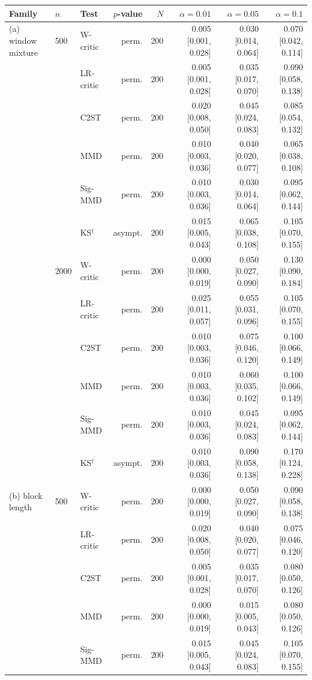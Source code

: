 \begin{tabular}{lllrrrrr}
\toprule
Family & $n$ & Test & $p$-value & $N$ & $\alpha=0.01$ & $\alpha=0.05$ & $\alpha=0.1$ \\
\midrule
(a) window mixture & 500 & W-critic & perm. & 200 & 0.005 [0.001, 0.028] & 0.030 [0.014, 0.064] & 0.070 [0.042, 0.114] \\
 &  & LR-critic & perm. & 200 & 0.005 [0.001, 0.028] & 0.035 [0.017, 0.070] & 0.090 [0.058, 0.138] \\
 &  & C2ST & perm. & 200 & 0.020 [0.008, 0.050] & 0.045 [0.024, 0.083] & 0.085 [0.054, 0.132] \\
 &  & MMD & perm. & 200 & 0.010 [0.003, 0.036] & 0.040 [0.020, 0.077] & 0.065 [0.038, 0.108] \\
 &  & Sig-MMD & perm. & 200 & 0.010 [0.003, 0.036] & 0.030 [0.014, 0.064] & 0.095 [0.062, 0.144] \\
 &  & KS$^{\dagger}$ & asympt. & 200 & 0.015 [0.005, 0.043] & 0.065 [0.038, 0.108] & 0.105 [0.070, 0.155] \\
 & 2000 & W-critic & perm. & 200 & 0.000 [0.000, 0.019] & 0.050 [0.027, 0.090] & 0.130 [0.090, 0.184] \\
 &  & LR-critic & perm. & 200 & 0.025 [0.011, 0.057] & 0.055 [0.031, 0.096] & 0.105 [0.070, 0.155] \\
 &  & C2ST & perm. & 200 & 0.010 [0.003, 0.036] & 0.075 [0.046, 0.120] & 0.100 [0.066, 0.149] \\
 &  & MMD & perm. & 200 & 0.010 [0.003, 0.036] & 0.060 [0.035, 0.102] & 0.100 [0.066, 0.149] \\
 &  & Sig-MMD & perm. & 200 & 0.010 [0.003, 0.036] & 0.045 [0.024, 0.083] & 0.095 [0.062, 0.144] \\
 &  & KS$^{\dagger}$ & asympt. & 200 & 0.010 [0.003, 0.036] & 0.090 [0.058, 0.138] & 0.170 [0.124, 0.228] \\
(b) block length & 500 & W-critic & perm. & 200 & 0.000 [0.000, 0.019] & 0.050 [0.027, 0.090] & 0.090 [0.058, 0.138] \\
 &  & LR-critic & perm. & 200 & 0.020 [0.008, 0.050] & 0.040 [0.020, 0.077] & 0.075 [0.046, 0.120] \\
 &  & C2ST & perm. & 200 & 0.005 [0.001, 0.028] & 0.035 [0.017, 0.070] & 0.080 [0.050, 0.126] \\
 &  & MMD & perm. & 200 & 0.000 [0.000, 0.019] & 0.015 [0.005, 0.043] & 0.080 [0.050, 0.126] \\
 &  & Sig-MMD & perm. & 200 & 0.015 [0.005, 0.043] & 0.045 [0.024, 0.083] & 0.105 [0.070, 0.155] \\

\end{tabular}
